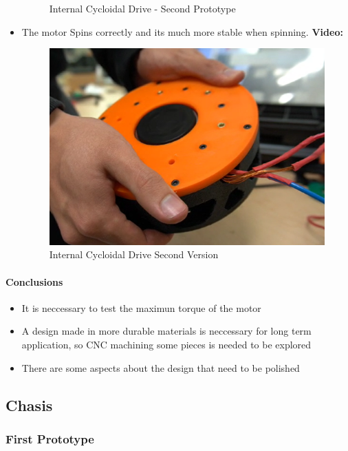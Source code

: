 \documentclass{article}
\begin{document}
\begin{itemize}
\begin{figure}[H]
        \caption{Internal Cycloidal Drive - Second Prototype}
    \end{figure}
    \item The motor Spins correctly and its much more stable when spinning. 
    \textbf{Video: }
    \begin{figure}[H]
        \centering
        \includegraphics[width=\linewidth]{Images/Motor/IntCycV2Spin.png}
        \caption{Internal Cycloidal Drive Second Version}
    \end{figure}
\end{itemize}

\paragraph[short]{Conclusions}
\begin{itemize}
    \item It is neccessary to test the maximun torque of the motor
    \item A design made in more durable materials is neccessary for long term application, so CNC machining some pieces is needed to be explored
    \item There are some aspects about the design that need to be polished
\end{itemize}

\subsection{Chasis}
\subsubsection[]{First Prototype}
\end{document}
